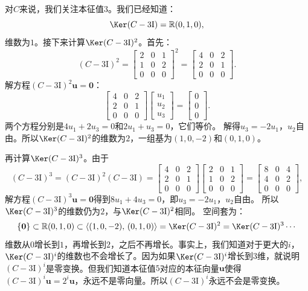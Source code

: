 \documentclass[12pt,UTF8]{ctexbook}
\begin{document}
对$C$来说，我们关注本征值$3$。我们已经知道：
$$
\Ker(C - 3\mathrm{I}) = \mathbb{R}(0,1,0),
$$
维数为$1$。接下来计算$\Ker(C - 3\mathrm{I})^2$。首先：
$$
(C - 3\mathrm{I})^2 = \begin{bmatrix} 2 & 0 & 1 \\ 1 & 0 & 2 \\ 0 & 0 & 0 \end{bmatrix}^2 = \begin{bmatrix} 4 & 0 & 2 \\ 2 & 0 & 1 \\ 0 & 0 & 0 \end{bmatrix}.
$$
解方程$(C - 3\mathrm{I})^2\mathbf{u} = \mathbf{0}$：
$$
\begin{bmatrix} 4 & 0 & 2 \\ 2 & 0 & 1 \\ 0 & 0 & 0 \end{bmatrix}\begin{bmatrix} u_1 \\ u_2 \\ u_3 \end{bmatrix} = \begin{bmatrix} 0 \\ 0 \\ 0 \end{bmatrix}.
$$
两个方程分别是$4u_1 + 2u_3 = 0$和$2u_1 + u_3 = 0$，它们等价。
解得$u_3 = -2u_1$，$u_2$自由。所以$\Ker(C - 3\mathrm{I})^2$的维数为$2$，一组基为$(1,0,-2)$和$(0,1,0)$。

再计算$\Ker(C - 3\mathrm{I})^3$。由于
$$
(C - 3\mathrm{I})^3 = (C - 3\mathrm{I})^2(C - 3\mathrm{I}) = \begin{bmatrix} 4 & 0 & 2 \\ 2 & 0 & 1 \\ 0 & 0 & 0 \end{bmatrix}\begin{bmatrix} 2 & 0 & 1 \\ 1 & 0 & 2 \\ 0 & 0 & 0 \end{bmatrix} = \begin{bmatrix} 8 & 0 & 4 \\ 4 & 0 & 2 \\ 0 & 0 & 0 \end{bmatrix},
$$
解方程$(C - 3\mathrm{I})^3\mathbf{u} = \mathbf{0}$得到$8u_1 + 4u_3 = 0$，即$u_3 = -2u_1$，$u_2$自由。
所以$\Ker(C - 3\mathrm{I})^3$的维数仍为$2$，与$\Ker(C - 3\mathrm{I})^2$相同。
空间套为：
$$
\{\mathbf{0}\} \subset \mathbb{R}(0,1,0) \subset \langle (1,0,-2),\, (0,1,0) \rangle = \Ker(C - 3\mathrm{I})^2 = \Ker(C - 3\mathrm{I})^3 \cdots
$$
维数从$0$增长到$1$，再增长到$2$，之后不再增长。事实上，我们知道对于更大的$i$，$\Ker(C - 3\mathrm{I})^i$的维数也不会增长了。因为如果$\Ker(C - 3\mathrm{I})^i$增长到$3$维，就说明$(C - 3\mathrm{I})^i$是零变换。但我们知道本征值$5$对应的本征向量$\mathbf{u}$使得$(C - 3\mathrm{I})^i\mathbf{u} = 2^i\mathbf{u}$，永远不是零向量。所以$(C - 3\mathrm{I})^i$永远不会是零变换。
\end{document}
